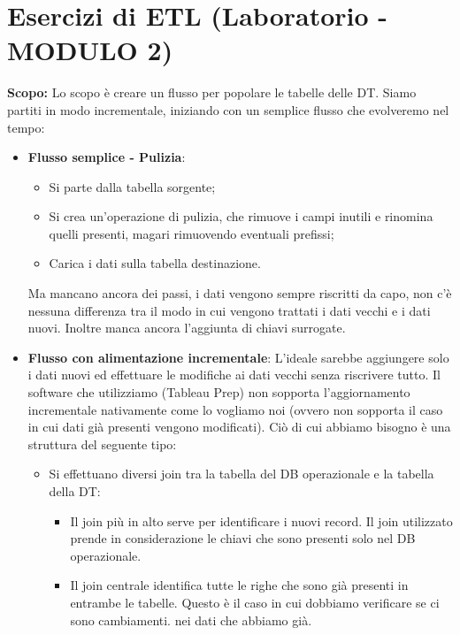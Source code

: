 \section{Esercizi di ETL (Laboratorio -  MODULO 2)}
\textbf{Scopo:}\newline
Lo scopo è creare un flusso per popolare le tabelle delle DT.\newline
Siamo partiti in modo incrementale, iniziando con un semplice flusso che evolveremo nel tempo:
\begin{itemize}
	\item \textbf{Flusso semplice - Pulizia}: \begin{itemize}
		\item Si parte dalla tabella sorgente;
		\item Si crea un'operazione di pulizia, che rimuove i campi inutili e rinomina quelli presenti, magari rimuovendo eventuali prefissi;
		\item Carica i dati sulla tabella destinazione.
	\end{itemize}
	Ma mancano ancora dei passi, i dati vengono sempre riscritti da capo, non c'è nessuna differenza tra il modo in cui vengono trattati i dati vecchi e i dati nuovi. Inoltre manca ancora l'aggiunta di chiavi surrogate.
	\item \textbf{Flusso con alimentazione incrementale}:
	L'ideale sarebbe aggiungere solo i dati nuovi ed effettuare le modifiche ai dati vecchi senza riscrivere tutto. Il software che utilizziamo (Tableau Prep) non sopporta l'aggiornamento incrementale nativamente come lo vogliamo noi (ovvero non sopporta il caso in cui dati già presenti vengono modificati).\newline
	Ciò di cui abbiamo bisogno è una struttura del seguente tipo:
	\begin{itemize}
		\item Si effettuano diversi join tra la tabella del DB operazionale e la tabella della DT:
		\begin{itemize}
			\item Il join più in alto serve per identificare i nuovi record. Il join utilizzato prende in considerazione le chiavi che sono presenti solo nel DB operazionale.
			\item Il join centrale identifica tutte le righe che sono già presenti in entrambe le tabelle. Questo è il caso in cui dobbiamo verificare se ci sono cambiamenti. nei dati che abbiamo già.

\end{itemize}
\end{itemize}
\end{itemize}
